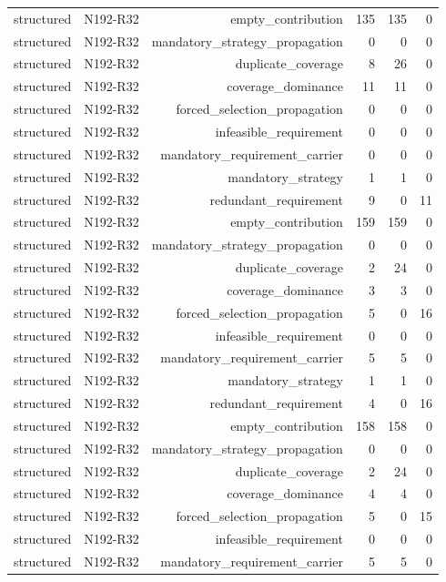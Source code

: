 {\begin{longtable}{lrrrrr}
structured & N192-R32 & empty\_contribution & 135 & 135 & 0 \\
structured & N192-R32 & mandatory\_strategy\_propagation & 0 & 0 & 0 \\
structured & N192-R32 & duplicate\_coverage & 8 & 26 & 0 \\
structured & N192-R32 & coverage\_dominance & 11 & 11 & 0 \\
structured & N192-R32 & forced\_selection\_propagation & 0 & 0 & 0 \\
structured & N192-R32 & infeasible\_requirement & 0 & 0 & 0 \\
structured & N192-R32 & mandatory\_requirement\_carrier & 0 & 0 & 0 \\
structured & N192-R32 & mandatory\_strategy & 1 & 1 & 0 \\
structured & N192-R32 & redundant\_requirement & 9 & 0 & 11 \\
structured & N192-R32 & empty\_contribution & 159 & 159 & 0 \\
structured & N192-R32 & mandatory\_strategy\_propagation & 0 & 0 & 0 \\
structured & N192-R32 & duplicate\_coverage & 2 & 24 & 0 \\
structured & N192-R32 & coverage\_dominance & 3 & 3 & 0 \\
structured & N192-R32 & forced\_selection\_propagation & 5 & 0 & 16 \\
structured & N192-R32 & infeasible\_requirement & 0 & 0 & 0 \\
structured & N192-R32 & mandatory\_requirement\_carrier & 5 & 5 & 0 \\
structured & N192-R32 & mandatory\_strategy & 1 & 1 & 0 \\
structured & N192-R32 & redundant\_requirement & 4 & 0 & 16 \\
structured & N192-R32 & empty\_contribution & 158 & 158 & 0 \\
structured & N192-R32 & mandatory\_strategy\_propagation & 0 & 0 & 0 \\
structured & N192-R32 & duplicate\_coverage & 2 & 24 & 0 \\
structured & N192-R32 & coverage\_dominance & 4 & 4 & 0 \\
structured & N192-R32 & forced\_selection\_propagation & 5 & 0 & 15 \\
structured & N192-R32 & infeasible\_requirement & 0 & 0 & 0 \\
structured & N192-R32 & mandatory\_requirement\_carrier & 5 & 5 & 0 \\

\end{longtable}}
